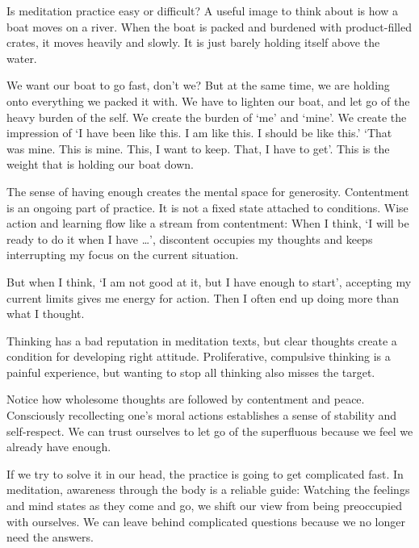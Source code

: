 \enlargethispage*{\baselineskip}


Is meditation practice easy or difficult? A useful image to think about
is how a boat moves on a river. When the boat is packed and burdened
with product-filled crates, it moves heavily and slowly. It is just
barely holding itself above the water.

We want our boat to go fast, don't we? But at the same time, we are
holding onto everything we packed it with. We have to lighten our boat,
and let go of the heavy burden of the self. We create the burden of `me'
and `mine'. We create the impression of `I have been like this. I am
like this. I should be like this.' `That was mine. This is mine. This, I
want to keep. That, I have to get'. This is the weight that is holding
our boat down.

The sense of having enough creates the mental space for generosity.
Contentment is an ongoing part of practice. It is not a fixed state
attached to conditions. Wise action and learning flow like a stream from
contentment: When I think, `I will be ready to do it when I have
\ldots{}', discontent occupies my thoughts and keeps interrupting my
focus on the current situation.


But when I think, `I am not good at it, but I have enough to start',
accepting my current limits gives me energy for action. Then I often end
up doing more than what I thought.

Thinking has a bad reputation in meditation texts, but clear thoughts
create a condition for developing right attitude. Proliferative,
compulsive thinking is a painful experience, but wanting to stop all
thinking also misses the target.

Notice how wholesome thoughts are followed by contentment and peace.
Consciously recollecting one's moral actions establishes a sense of
stability and self-respect. We can trust ourselves to let go of the
superfluous because we feel we already have enough.

If we try to solve it in our head, the practice is going to get
complicated fast. In meditation, awareness through the body is a
reliable guide: Watching the feelings and mind states as they come and
go, we shift our view from being preoccupied with ourselves. We can
leave behind complicated questions because we no longer need the
answers.

